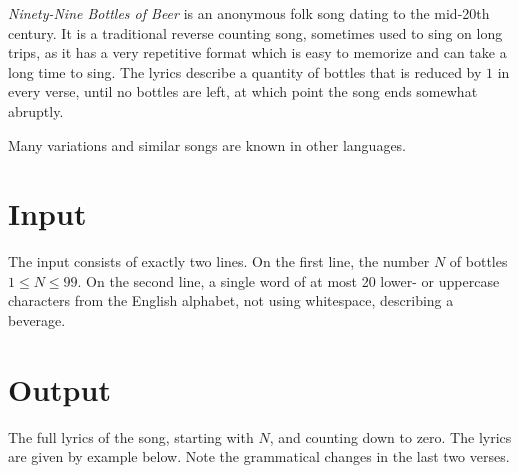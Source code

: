 

\emph{Ninety-Nine Bottles of Beer} is an anonymous folk song dating to the mid-20th century.
It is a traditional reverse counting song, sometimes used to sing on long trips, as it has a very repetitive format which is easy to memorize and can take a long time to sing.
The lyrics describe a quantity of bottles that is reduced by $1$ in every verse, until no bottles are left, at which point the song ends somewhat abruptly.

Many variations and similar songs are known in other languages.

\section*{Input}

The input consists of exactly two lines.
On the first line, the number $N$ of bottles $1\leq N\leq 99$.
On the second line, a single word of at most 20 lower- or uppercase characters from the English alphabet, not using whitespace, describing a beverage.

\section*{Output}

The full lyrics of the song, starting with $N$, and counting down to zero.
The lyrics are given by example below.
Note the grammatical changes in the last two verses.
